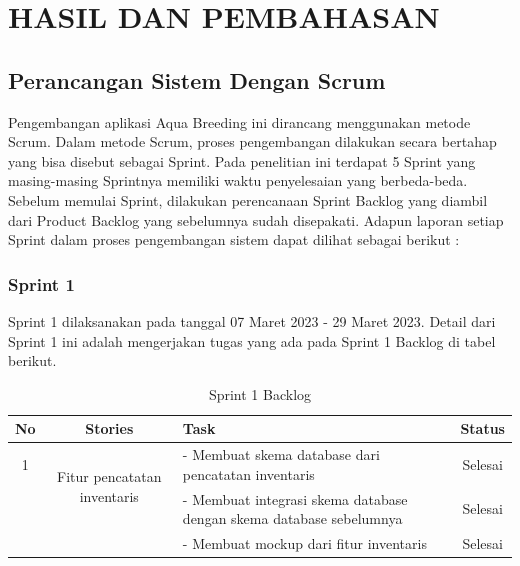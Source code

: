 
\chapter{HASIL DAN PEMBAHASAN}

\begin{spacing}{1.5}

\section{Perancangan Sistem Dengan Scrum}

Pengembangan aplikasi Aqua Breeding ini dirancang menggunakan metode Scrum. Dalam metode Scrum, proses pengembangan dilakukan secara bertahap yang bisa disebut sebagai Sprint. Pada penelitian ini terdapat 5 Sprint yang masing-masing Sprintnya memiliki waktu penyelesaian yang berbeda-beda. Sebelum memulai Sprint, dilakukan perencanaan Sprint Backlog yang diambil dari Product Backlog yang sebelumnya sudah disepakati. Adapun laporan setiap Sprint dalam proses pengembangan sistem dapat dilihat sebagai berikut :

\subsection{Sprint 1}

Sprint 1 dilaksanakan pada tanggal 07 Maret 2023 - 29 Maret 2023. Detail dari Sprint 1 ini adalah mengerjakan tugas yang ada pada Sprint 1 Backlog di tabel berikut.

	\begin{table}[H]	
		\begin{center}
			\caption{Sprint 1 Backlog}
			\label{tab:table6}
			\begin{tabular}{|c|c|m{13em}|c|}
			\hline
			\textbf{No} & \textbf{Stories} & \textbf{Task} & \textbf{Status} \\
			\hline
			1 & \multirow{2}{12em}{Fitur pencatatan inventaris} & - Membuat skema database dari pencatatan inventaris & Selesai \\
			&  & - Membuat integrasi skema database dengan skema database sebelumnya & Selesai \\
			&  & - Membuat mockup dari fitur inventaris & Selesai \\
			\hline
			\end{tabular}
		\end{center}
	\end{table}


\end{spacing}
